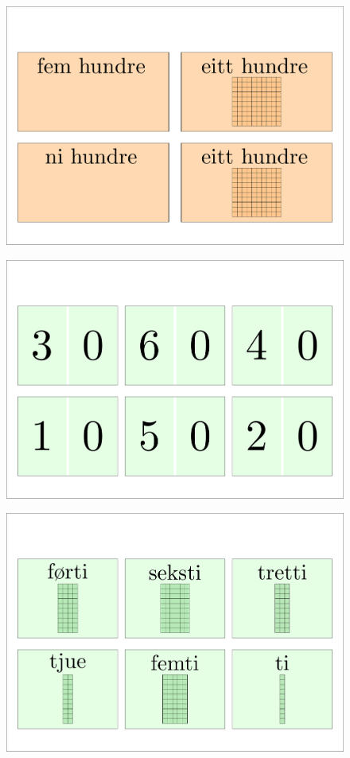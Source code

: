 \begin{figure}
	\centering
	\includegraphics[scale=0.999]{900b}
\end{figure} 

\begin{figure}
	\centering
	\includegraphics[scale=0.999]{10to60a}
\end{figure}

\begin{figure}
	\centering
	\includegraphics[scale=0.999]{10to60b}
\end{figure}

